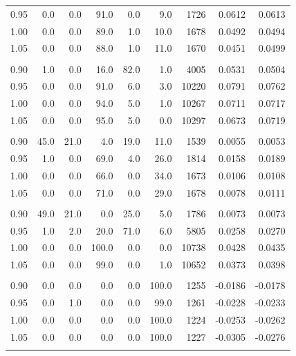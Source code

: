 \begin{table}[t]
\begin{tabular}{r r r r r r r r r}
0.95 & 0.0 & 0.0 & 91.0 & 0.0 & 9.0 & 1726 & 0.0612 & 0.0613 \\
1.00 & 0.0 & 0.0 & 89.0 & 1.0 & 10.0 & 1678 & 0.0492 & 0.0494 \\
1.05 & 0.0 & 0.0 & 88.0 & 1.0 & 11.0 & 1670 & 0.0451 & 0.0499 \\
\addlinespace[0.35em]
\multicolumn{9}{l}{$N=16$, $\mathrm{ppn}=4$, $t=10\,\mathrm{s}$} \\
\midrule
0.90 & 1.0 & 0.0 & 16.0 & 82.0 & 1.0 & 4005 & 0.0531 & 0.0504 \\
0.95 & 0.0 & 0.0 & 91.0 & 6.0 & 3.0 & 10220 & 0.0791 & 0.0762 \\
1.00 & 0.0 & 0.0 & 94.0 & 5.0 & 1.0 & 10267 & 0.0711 & 0.0717 \\
1.05 & 0.0 & 0.0 & 95.0 & 5.0 & 0.0 & 10297 & 0.0673 & 0.0719 \\
\addlinespace[0.35em]
\multicolumn{9}{l}{$N=16$, $\mathrm{ppn}=8$, $t=1\,\mathrm{s}$} \\
\midrule
0.90 & 45.0 & 21.0 & 4.0 & 19.0 & 11.0 & 1539 & 0.0055 & 0.0053 \\
0.95 & 1.0 & 0.0 & 69.0 & 4.0 & 26.0 & 1814 & 0.0158 & 0.0189 \\
1.00 & 0.0 & 0.0 & 66.0 & 0.0 & 34.0 & 1673 & 0.0106 & 0.0108 \\
1.05 & 0.0 & 0.0 & 71.0 & 0.0 & 29.0 & 1678 & 0.0078 & 0.0111 \\
\addlinespace[0.35em]
\multicolumn{9}{l}{$N=16$, $\mathrm{ppn}=8$, $t=10\,\mathrm{s}$} \\
\midrule
0.90 & 49.0 & 21.0 & 0.0 & 25.0 & 5.0 & 1786 & 0.0073 & 0.0073 \\
0.95 & 1.0 & 2.0 & 20.0 & 71.0 & 6.0 & 5805 & 0.0258 & 0.0270 \\
1.00 & 0.0 & 0.0 & 100.0 & 0.0 & 0.0 & 10738 & 0.0428 & 0.0435 \\
1.05 & 0.0 & 0.0 & 99.0 & 0.0 & 1.0 & 10652 & 0.0373 & 0.0398 \\
\addlinespace[0.35em]
\multicolumn{9}{l}{$N=32$, $\mathrm{ppn}=4$, $t=1\,\mathrm{s}$} \\
\midrule
0.90 & 0.0 & 0.0 & 0.0 & 0.0 & 100.0 & 1255 & -0.0186 & -0.0178 \\
0.95 & 0.0 & 1.0 & 0.0 & 0.0 & 99.0 & 1261 & -0.0228 & -0.0233 \\
1.00 & 0.0 & 0.0 & 0.0 & 0.0 & 100.0 & 1224 & -0.0253 & -0.0262 \\
1.05 & 0.0 & 0.0 & 0.0 & 0.0 & 100.0 & 1227 & -0.0305 & -0.0276 \\
\addlinespace[0.35em]
\multicolumn{9}{l}{$N=32$, $\mathrm{ppn}=4$, $t=10\,\mathrm{s}$} \\

\end{tabular}
\end{table}
